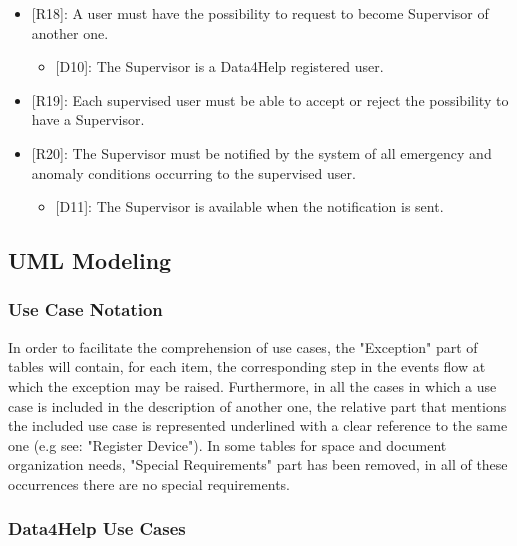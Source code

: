 \begin{itemize}[itemsep=0em]
	\item {[R18]: A user must have the possibility to request to become Supervisor of another one.}
	\begin{itemize}
		\item {[D10]: The Supervisor is a Data4Help registered user.}
	\end{itemize}
	\item {[R19]: Each supervised user must be able to accept or reject the possibility to have a Supervisor.}
	\item {[R20]: The Supervisor must be notified by the system of all emergency and anomaly conditions occurring to the supervised user.}
	\begin{itemize}[topsep=0em]
		\item {[D11]: The Supervisor is available when the notification is sent.}
	\end{itemize}
\end{itemize}

{\color{Blue}\subsection{UML Modeling}}

{\color{Blue}\subsubsection{Use Case Notation}}
In order to facilitate the comprehension of use cases, the "Exception" part of tables will contain, for each item, the corresponding step in the events flow at which the exception may be raised. Furthermore, in all the cases in which a use case is included in the description of another one, the relative part that mentions the included use case is represented underlined with a clear reference to the same one (e.g see: "Register Device"). In some tables for space and document organization needs, "Special Requirements" part has been removed, in all of these occurrences there are no special requirements. 

{\color{Blue}\subsubsection{Data4Help Use Cases}}

